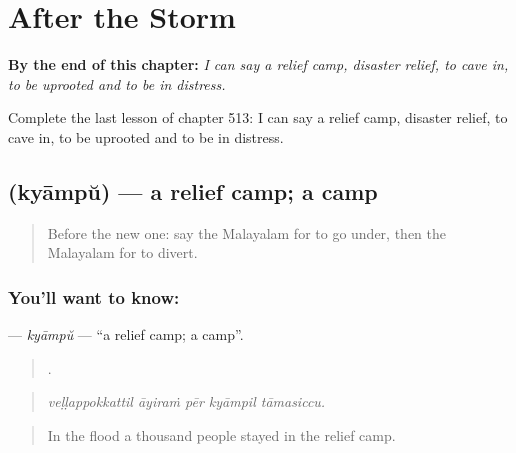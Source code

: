 
\chapter{After the Storm}
\label{ch:ml-after-the-storm}

\begin{chapteropening}
\textbf{By the end of this chapter:} \emph{I can say a relief camp, disaster relief, to cave in, to be uprooted and to be in distress.}

Complete the last lesson of chapter 513: I can say a relief camp, disaster relief, to cave in, to be uprooted and to be in distress.
\end{chapteropening}

\section[\texorpdfstring{\ml{ക്യാമ്പ്} (kyāmpŭ)}{ക്യാമ്പ് (kyāmpŭ)}]{ (kyāmpŭ) — a relief camp; a camp}

\label{lesson:ML-C513-kyampu}



\begin{quote}
Before the new one: say the Malayalam for to go under, then the Malayalam for to divert.
\end{quote}

\subsection*{You'll want to know: }
\textbf{} — \emph{kyāmpŭ} — \textquotedblleft{}a relief camp; a camp\textquotedblright{}.

\begin{quote}
    .
\end{quote}

\begin{quote}
\emph{veḷḷappokkattil āyiraṁ pēr kyāmpil tāmasiccu.}
\end{quote}

\begin{quote}
In the flood a thousand people stayed in the relief camp.
\end{quote}

